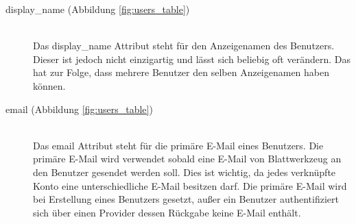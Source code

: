 \documentclass[paper=a4,fontsize=12pt,parskip=half]{scrartcl}
\begin{document}
	\begin{description}
		\item[display\_name (Abbildung \ref{fig:users_table})]\hfill\\
		Das display\_name Attribut steht für den Anzeigenamen des Benutzers. Dieser ist jedoch nicht einzigartig und lässt sich beliebig oft verändern. Das hat zur Folge, dass mehrere Benutzer den selben Anzeigenamen haben können.
		\item[email (Abbildung \ref{fig:users_table})]\hfill\\
		Das email Attribut steht für die primäre E-Mail eines Benutzers. Die primäre E-Mail wird verwendet sobald eine E-Mail von Blattwerkzeug an den Benutzer gesendet werden soll. Dies ist wichtig, da jedes verknüpfte Konto eine unterschiedliche E-Mail besitzen darf. Die primäre E-Mail wird bei Erstellung eines Benutzers gesetzt, außer ein Benutzer authentifiziert sich über einen Provider dessen Rückgabe keine E-Mail enthält.
	\end{description}
\end{document}
